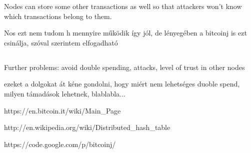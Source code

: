 \documentclass[a4paper,12pt]{article}
\begin{document}
Nodes can store some other transactions as well so that attackers won't know which transactions belong to them.

Nos ezt nem tudom h mennyire működik így jól, de lényegében a bitcoinj is ezt csinálja, szóval szerintem elfogadható

\subsection{}
Further problems: avoid double spending, attacks, level of trust in other nodes

ezeket a dolgokat át kéne gondolni, hogy miért nem lehetséges duoble spend, milyen támadások lehetnek, blablabla... 



\newpage
\begin{thebibliography}{9}
\bibitem{}
https://en.bitcoin.it/wiki/Main\_Page
\label{bitcoinwiki}

\bibitem{}
http://en.wikipedia.org/wiki/Distributed\_hash\_table
\label{dhtwiki}

\bibitem{}
https://code.google.com/p/bitcoinj/
\label{bitcoinj}

\end{thebibliography}
\end{document}
